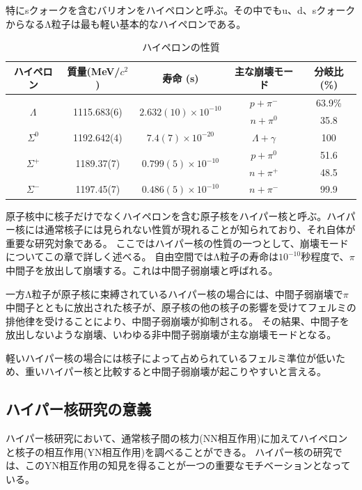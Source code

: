 \documentclass[a4paper,11pt,uplatex]{jsbook}
\begin{document}
特にsクォークを含むバリオンをハイペロンと呼ぶ。その中でもu、d、sクォークからなるΛ粒子は最も軽い基本的なハイペロンである。
\begin{table}[h]
\centering
\begin{tabular}{|c|c|c|c|c|}
  \hline
  ハイペロン&質量(MeV/$c^2$)&寿命 (s)&主な崩壊モード&分岐比(\%)\\
  \hline \hline 
  \multirow{2}{*}{$\Lambda$} & \multirow{2}{*}{1115.683(6)} & \multirow{2}{*}{$2.632(10) \times 10^{-10}$} & $p + \pi^-$ &63.9\%\\
                             &                              &                                              & $n + \pi^0$ & 35.8\\ \hline
  $\Sigma^0$                 & 1192.642(4)                  & $7.4(7) \times 10^{-20}$                     & $\Lambda + \gamma$ & 100\\ \hline
  \multirow{2}{*}{$\Sigma^+$}& \multirow{2}{*}{1189.37(7)}  & \multirow{2}{*}{$0.799(5) \times 10^{-10}$}  & $p + \pi^0$ & 51.6\\
                             &                              &                                              & $n + \pi^+$ & 48.5\\ \hline
  $\Sigma^-$                 & 1197.45(7)                   & $0.486(5) \times 10^{-10}$                   & $n + \pi^-$ & 99.9\\ \hline
\end{tabular}
\caption{ハイペロンの性質}
\end{table}

原子核中に核子だけでなくハイペロンを含む原子核をハイパー核と呼ぶ。ハイパー核には通常核子には見られない性質が現れることが知られており、それ自体が重要な研究対象である。
ここではハイパー核の性質の一つとして、崩壊モードについてこの章で詳しく述べる。
自由空間ではΛ粒子の寿命は$10^{-10}$秒程度で、$\pi$中間子を放出して崩壊する。これは中間子弱崩壊と呼ばれる。

一方Λ粒子が原子核に束縛されているハイパー核の場合には、中間子弱崩壊で$\pi$中間子とともに放出された核子が、原子核の他の核子の影響を受けてフェルミの排他律を受けることにより、中間子弱崩壊が抑制される。
その結果、中間子を放出しないような崩壊、いわゆる非中間子弱崩壊が主な崩壊モードとなる。

軽いハイパー核の場合には核子によって占められているフェルミ準位が低いため、重いハイパー核と比較すると中間子弱崩壊が起こりやすいと言える。

\subsection{ハイパー核研究の意義}
ハイパー核研究において、通常核子間の核力(NN相互作用)に加えてハイペロンと核子の相互作用(YN相互作用)を調べることができる。
ハイパー核の研究では、このYN相互作用の知見を得ることが一つの重要なモチベーションとなっている。
\end{document}
